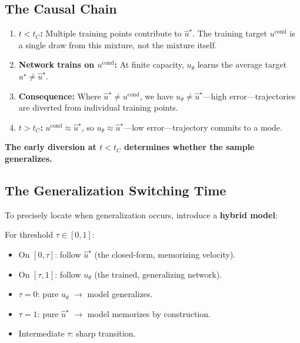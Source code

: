 \documentclass[11pt, a4paper]{article}
\theoremstyle{plain}
\theoremstyle{definition}
\theoremstyle{remark}
\begin{document}
\subsection{The Causal Chain}

\begin{tcolorbox}[colback=lightgray,colframe=darkgray,arc=4pt,title={\textbf{Causal Mechanism: From Stochastic Regime to Generalization}},fonttitle=\bfseries]
\begin{enumerate}
  \item \textbf{$t < t_C$:} Multiple training points contribute to $\hat{u}^\star$. The training target $u^{\mathrm{cond}}$ is a single draw from this mixture, not the mixture itself.
  \item \textbf{Network trains on $u^{\mathrm{cond}}$:} At finite capacity, $u_\theta$ learns the average target $u^\star \neq \hat{u}^\star$.
  \item \textbf{Consequence:} Where $\hat{u}^\star \neq u^{\mathrm{cond}}$, we have $u_\theta \neq \hat{u}^\star$---high error---trajectories are diverted from individual training points.
  \item \textbf{$t > t_C$:} $u^{\mathrm{cond}} \approx \hat{u}^\star$, so $u_\theta \approx \hat{u}^\star$---low error---trajectory commits to a mode.
\end{enumerate}
\textbf{The early diversion at $t < t_C$ determines whether the sample generalizes.}
\end{tcolorbox}

\subsection{The Generalization Switching Time}

To precisely locate when generalization occurs, introduce a \textbf{hybrid model}:

\begin{defbox}
For threshold $\tau \in [0,1]$:
\begin{itemize}
  \item On $[0, \tau]$: follow $\hat{u}^\star$ (the closed-form, memorizing velocity).
  \item On $[\tau, 1]$: follow $u_\theta$ (the trained, generalizing network).
\end{itemize}
\begin{itemize}
  \item $\tau = 0$: pure $u_\theta$ $\to$ model generalizes.
  \item $\tau = 1$: pure $\hat{u}^\star$ $\to$ model memorizes by construction.
  \item Intermediate $\tau$: sharp transition.
\end{itemize}
\end{defbox}
\end{document}
